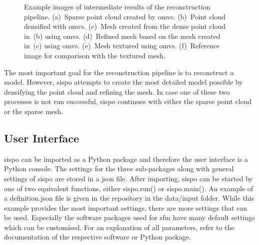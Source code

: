 \begin{figure}[htbp]
\begin{subfigure}[b]{0.4\textwidth}
        \caption{}
        \label{fig:recon_step_img}
    \end{subfigure}
    \caption{Example images of intermediate results of the reconstruction pipeline. (a)~Sparse point cloud created by \gls{omvs}. (b)~Point cloud densified with \gls{omvs}. (c)~Mesh created from the dense point cloud in~(b) using \gls{omvs}. (d)~Refined mesh based on the mesh created in~(c) using \gls{omvs}. (e)~Mesh textured using \gls{omvs}. (f)~Reference image for comparison with the textured mesh.}
    \label{fig:recon_steps}
\end{figure}

The most important goal for the reconstruction pipeline is to reconstruct a model. However, \gls{sispo} attempts to create the most detailed model possible by densifying the point cloud and refining the mesh. In case one of these two processes is not run successful, \gls{sispo} continues with either the sparse point cloud or the sparse mesh.

\subsection{User Interface}
\Gls{sispo} can be imported as a Python package and therefore the user interface is a Python console. The settings for the three sub-packages along with general settings of \gls{sispo} are stored in a \gls{json} file. After importing, \gls{sispo} can be started by one of two equivalent functions, either sispo.run() or sispo.main(). An example of a definition.json file is given in the repository in the data/input folder. While this example provides the most important settings, there are more settings that can be used. Especially the software packages used for \gls{sfm} have many default settings which can be customised. For an explanation of all parameters, refer to the documentation of the respective software or Python package.

